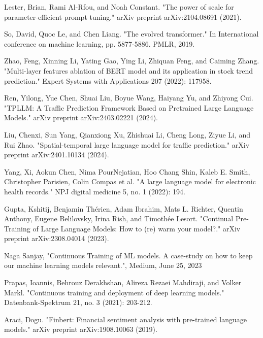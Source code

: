 \documentclass[runningheads]{llncs}
\begin{document}
\begin{thebibliography}{8}
Lester, Brian, Rami Al-Rfou, and Noah Constant. "The power of scale for parameter-efficient prompt tuning." arXiv preprint arXiv:2104.08691 (2021).

So, David, Quoc Le, and Chen Liang. "The evolved transformer." In International conference on machine learning, pp. 5877-5886. PMLR, 2019.

Zhao, Feng, Xinning Li, Yating Gao, Ying Li, Zhiquan Feng, and Caiming Zhang. "Multi-layer features ablation of BERT model and its application in stock trend prediction." Expert Systems with Applications 207 (2022): 117958.

Ren, Yilong, Yue Chen, Shuai Liu, Boyue Wang, Haiyang Yu, and Zhiyong Cui. "TPLLM: A Traffic Prediction Framework Based on Pretrained Large Language Models." arXiv preprint arXiv:2403.02221 (2024).

Liu, Chenxi, Sun Yang, Qianxiong Xu, Zhishuai Li, Cheng Long, Ziyue Li, and Rui Zhao. "Spatial-temporal large language model for traffic prediction." arXiv preprint arXiv:2401.10134 (2024).

Yang, Xi, Aokun Chen, Nima PourNejatian, Hoo Chang Shin, Kaleb E. Smith, Christopher Parisien, Colin Compas et al. "A large language model for electronic health records." NPJ digital medicine 5, no. 1 (2022): 194.

Gupta, Kshitij, Benjamin Thérien, Adam Ibrahim, Mats L. Richter, Quentin Anthony, Eugene Belilovsky, Irina Rish, and Timothée Lesort. "Continual Pre-Training of Large Language Models: How to (re) warm your model?." arXiv preprint arXiv:2308.04014 (2023).

Naga Sanjay, "Continuous Training of ML models. A case-study on how to keep our machine learning models relevant.", Medium, June 25, 2023

Prapas, Ioannis, Behrouz Derakhshan, Alireza Rezaei Mahdiraji, and Volker Markl. "Continuous training and deployment of deep learning models." Datenbank-Spektrum 21, no. 3 (2021): 203-212.

Araci, Dogu. "Finbert: Financial sentiment analysis with pre-trained language models." arXiv preprint arXiv:1908.10063 (2019).


\end{thebibliography}
\end{document}
